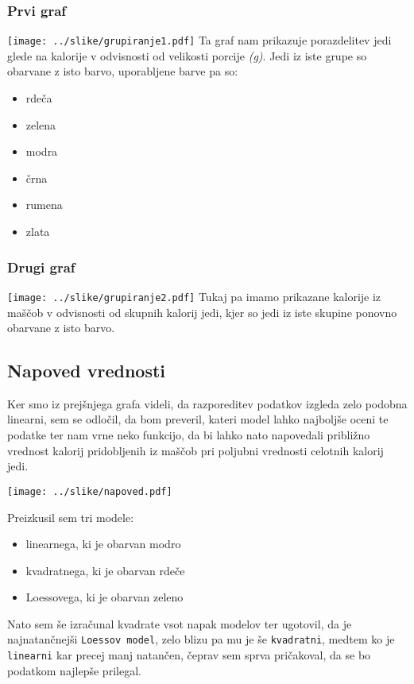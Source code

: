 \documentclass[hidelinks, 11pt,a4paper]{article}
\begin{document}
\subsubsection{Prvi graf}
\texttt{[image: ../slike/grupiranje1.pdf]}
Ta graf nam prikazuje porazdelitev jedi glede na kalorije v odvisnosti od velikosti porcije \textit{(g)}. Jedi iz iste grupe so obarvane z isto barvo, uporabljene barve pa so:
\begin{itemize}
	\item rdeča
	\item zelena
	\item modra
	\item črna
	\item rumena
	\item zlata
\end{itemize}

\subsubsection{Drugi graf}
\texttt{[image: ../slike/grupiranje2.pdf]}
Tukaj pa imamo prikazane kalorije iz maščob v odvisnosti od skupnih kalorij jedi, kjer so jedi iz iste skupine ponovno obarvane z isto barvo.

\newpage
\subsection{Napoved vrednosti}
Ker smo iz prejšnjega grafa videli, da razporeditev podatkov izgleda zelo podobna linearni, sem se odločil, da bom preveril, kateri model lahko najboljše oceni te podatke ter nam vrne neko funkcijo, da bi lahko nato napovedali približno vrednost kalorij pridobljenih iz maščob pri poljubni vrednosti celotnih kalorij jedi. 

\texttt{[image: ../slike/napoved.pdf]}

\noindent
Preizkusil sem tri modele:
\begin{itemize}
	\item linearnega, ki je obarvan modro
	\item kvadratnega, ki je obarvan rdeče
	\item Loessovega, ki je obarvan zeleno
\end{itemize}

\noindent
Nato sem še izračunal kvadrate vsot napak modelov ter ugotovil, da je najnatančnejši \verb|Loessov model|, zelo blizu pa mu je še \verb|kvadratni|, medtem ko je \verb|linearni| kar precej manj natančen, čeprav sem sprva pričakoval, da se bo podatkom najlepše prilegal.
\end{document}
